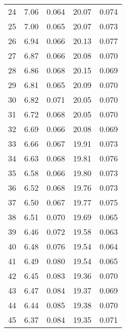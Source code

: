 \begin{table}
\begin{tabular}{c|ll|ll}
24 & 7.06 & 0.064 & 20.07 & 0.074 \\
25 & 7.00 & 0.065 & 20.07 & 0.073 \\
26 & 6.94 & 0.066 & 20.13 & 0.077 \\
27 & 6.87 & 0.066 & 20.08 & 0.070 \\
28 & 6.86 & 0.068 & 20.15 & 0.069 \\
29 & 6.81 & 0.065 & 20.09 & 0.070 \\
30 & 6.82 & 0.071 & 20.05 & 0.070 \\
31 & 6.72 & 0.068 & 20.05 & 0.070 \\
32 & 6.69 & 0.066 & 20.08 & 0.069 \\
33 & 6.66 & 0.067 & 19.91 & 0.073 \\
34 & 6.63 & 0.068 & 19.81 & 0.076 \\
35 & 6.58 & 0.066 & 19.80 & 0.073 \\
36 & 6.52 & 0.068 & 19.76 & 0.073 \\
37 & 6.50 & 0.067 & 19.77 & 0.075 \\
38 & 6.51 & 0.070 & 19.69 & 0.065 \\
39 & 6.46 & 0.072 & 19.58 & 0.063 \\
40 & 6.48 & 0.076 & 19.54 & 0.064 \\
41 & 6.49 & 0.080 & 19.54 & 0.065 \\
42 & 6.45 & 0.083 & 19.36 & 0.070 \\
43 & 6.47 & 0.084 & 19.37 & 0.069 \\
44 & 6.44 & 0.085 & 19.38 & 0.070 \\
45 & 6.37 & 0.084 & 19.35 & 0.071 \\
               \hline
        \end{tabular}
    \end{table}
    \clearpage

